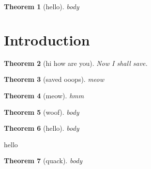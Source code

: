 \documentclass{article}
\newtheorem{theorem}{Theorem}[section]
\begin{document}
\begin{theorem}[hello] \label{thm:hello}
    body
\end{theorem}
\section{Introduction} \label{sec:introduction}

\begin{theorem}[hi how are you] \label{thm:hi_how_are_you}
    Now I shall save.
\end{theorem}
\begin{theorem}[saved ooops] \label{thm:saved_ooops}
    meow
\end{theorem}
\begin{theorem}[meow] \label{thm:introduction:meow}
    hmm
\end{theorem}
\begin{theorem}[woof] \label{thm:woof}
    body
\end{theorem}
\begin{theorem}[hello] \label{thm:introduction:hello}
    body
\end{theorem}

hello
\begin{theorem}[quack] \label{thm:introduction:quack}
    body
\end{theorem}

\end{document}
